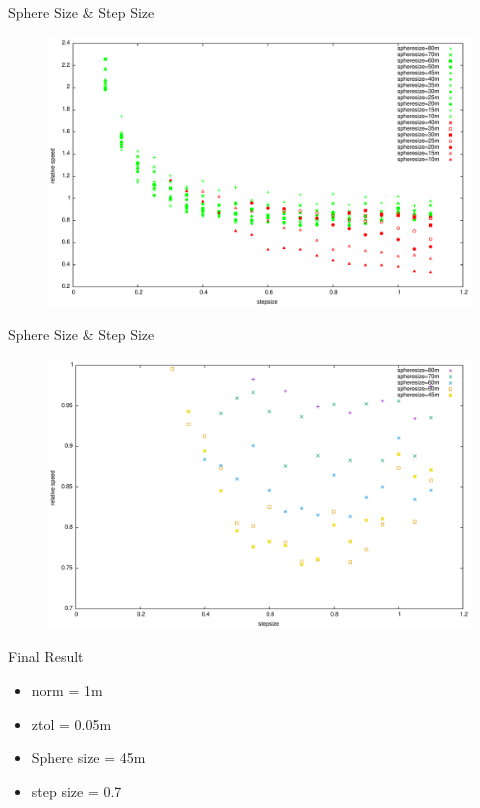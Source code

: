 \documentclass{beamer}
\begin{document}
\begin{frame}{Sphere Size \& Step Size}
	\begin{figure}
		\includegraphics[width=\textwidth]{figures/SphereAndStepAll.pdf}
	\end{figure}
\end{frame}
\begin{frame}{Sphere Size \& Step Size}
	\begin{figure}
		\includegraphics[width=\textwidth]{figures/SphereAndStepFinal.pdf}
	\end{figure}
\end{frame}
\begin{frame}{Final Result}
	\begin{itemize}
		\item norm = 1m
		\item ztol = 0.05m
		\item Sphere size = 45m
		\item step size = 0.7
	\end{itemize}
\end{frame}
\end{document}
